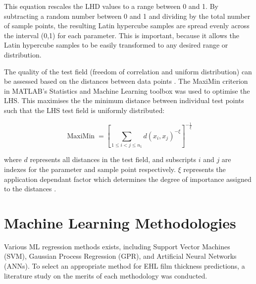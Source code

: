 This equation rescales the LHD values to a range between 0 and 1. By subtracting a random number between 0 and 1 and dividing by the total number of sample points, the resulting Latin hypercube samples are spread evenly across the interval (0,1) for each parameter. This is important, because it allows the Latin hypercube samples to be easily transformed to any desired range or distribution.

The quality of the test field (freedom of correlation and uniform distribution) can be assessed based on the distances between data points \cite{Johnson1990}. The MaxiMin criterion in MATLAB's Statistics and Machine Learning toolbox was used to optimise the LHS. This maximises the the minimum distance between individual test points such that the LHS test field is uniformly distributed:

\begin{equation}\label{maximin}
	\operatorname{MaxiMin}=\left[\sum_{1 \leq i<j \leq n_1} d\left(x_i, x_j\right)^{-\xi}\right]^{-\frac{1}{\xi}}
\end{equation}

where $d$ represents all distances in the test field, and subscripts $i$ and $j$ are indexes for the parameter and sample point respectively. $\xi$ represents the application dependant factor which determines the degree of importance assigned to the distances \cite{Siebertz2010}.






















\section{Machine Learning Methodologies}

Various ML regression methods exists, including Support Vector Machines (SVM), Gaussian Process Regression (GPR), and Artificial Neural Networks (ANNs). To select an appropriate method for EHL film thickness predictions, a literature study on the merits of each methodology was conducted. 
 

